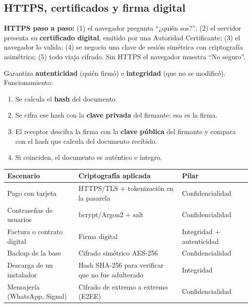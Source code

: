\documentclass[12pt,a4paper]{article}
\begin{document}
\subsection{HTTPS, certificados y firma digital}

\textbf{HTTPS paso a paso:} (1) el navegador pregunta ``¿qui\'en sos?''; (2) el
servidor presenta su \textbf{certificado digital}, emitido por una Autoridad
Certificante; (3) el navegador lo valida; (4) se negocia una clave de sesi\'on
sim\'etrica con criptograf\'ia asim\'etrica; (5) todo viaja cifrado. Sin HTTPS el
navegador muestra ``No seguro''.

\begin{cajaDefinicion}[title={Firma digital}]
Garantiza \textbf{autenticidad} (qui\'en firm\'o) e \textbf{integridad} (que no se
modific\'o). Funcionamiento:
\begin{enumerate}
  \item Se calcula el \textbf{hash} del documento.
  \item Se cifra ese hash con la \textbf{clave privada} del firmante: esa es la firma.
  \item El receptor descifra la firma con la \textbf{clave p\'ublica} del firmante y compara con el hash que calcula del documento recibido.
  \item Si coinciden, el documento es aut\'entico e \'integro.
\end{enumerate}
\end{cajaDefinicion}

\begin{tabularx}{\textwidth}{|>{\raggedright\arraybackslash}p{4.2cm}|X|>{\raggedright\arraybackslash}p{3cm}|}
\hline
\rowcolor{grisClaro}
\textbf{Escenario} & \textbf{Criptograf\'ia aplicada} & \textbf{Pilar} \\
\hline
Pago con tarjeta & HTTPS/TLS + tokenizaci\'on en la pasarela & Confidencialidad \\
\hline
Contrase\~nas de usuarios & bcrypt/Argon2 + salt & Confidencialidad \\
\hline
Factura o contrato digital & Firma digital & Integridad + autenticidad \\
\hline
Backup de la base & Cifrado sim\'etrico AES-256 & Confidencialidad \\
\hline
Descarga de un instalador & Hash SHA-256 para verificar que no fue adulterado & Integridad \\
\hline
Mensajer\'ia (WhatsApp, Signal) & Cifrado de extremo a extremo (E2EE) & Confidencialidad \\
\hline
\end{tabularx}
\end{document}
